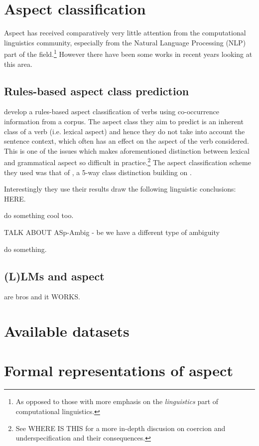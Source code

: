 \section{Aspect classification}
Aspect has received comparatively very little attention from the computational linguistics community\citep{friedrich-etal-2023-kind}, especially from the Natural Language Processing (NLP) part of the field.\footnote{As opposed to those with more emphasis on the \emph{linguistics} part of computational linguistics.} However there have been some works in recent years looking at this area.

\subsection{Rules-based aspect class prediction}
\citet{siegel-mckeown-2000-learning} develop a rules-based aspect classification of verbs using co-occurrence information from a corpus. The aspect class they aim to predict is an inherent class of a verb (i.e. lexical aspect) and hence they do not take into account the sentence context, which often has an effect on the aspect of the verb considered. This is one of the issues which makes aforementioned distinction between lexical and grammatical aspect so difficult in practice.\footnote{See WHERE IS THIS for a more in-depth discusion on coercion and underspecification and their consequences.} The aspect classification scheme they used was that of \citet{moens-steedman-1988-temporal}, a 5-way class distinction building on \citet{vendler57}.

Interestingly they use their results draw the following linguistic conclusions: HERE.

\citet{annotAndAutoClassOfAspectCat} do something cool too.

TALK ABOUT ASp-Ambig - be we have a different type of ambiguity

\citet{chen-etal-2021-autoaspect} do something.

\subsection{(L)LMs and aspect}
\citet{metheniti-etal-2022-time} are bros and it WORKS.

\section{Available datasets}

\section{Formal representations of aspect}
